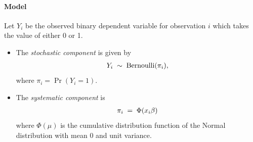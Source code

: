 \documentclass[letterpaper,10pt,english]{sphinxmanual}
\begin{document}
\paragraph{Model}
\label{zelig-probit:model}
Let \(Y_i\) be the observed binary dependent variable for
observation \(i\) which takes the value of either 0 or 1.
\begin{itemize}
\item {} 
The \emph{stochastic component} is given by
\begin{gather}
\begin{split}Y_i \; \sim \; \textrm{Bernoulli}(\pi_i),\end{split}\notag
\end{gather}
where \(\pi_i=\Pr(Y_i=1)\).

\item {} 
The \emph{systematic component} is
\begin{gather}
\begin{split}\pi_i \; = \; \Phi (x_i \beta)\end{split}\notag
\end{gather}
where \(\Phi(\mu)\) is the cumulative distribution function of
the Normal distribution with mean 0 and unit variance.

\end{itemize}
\end{document}
